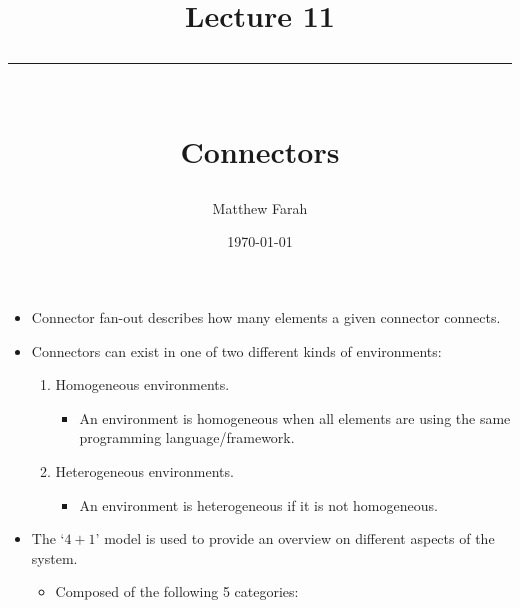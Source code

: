 \documentclass{article}
\date{
	\vspace{-.75em}
	{\large \today}
}
\title{
	\vspace*{-1.5em}
	{\Huge Lecture 11} \\
	\vspace{-1em}
	\rule{\textwidth/4}{.01em} \\
	\vspace{-.25em}
	{\Large Connectors}
	\vspace{-.75em}
}
\author{
	{\large Matthew Farah}
}
\begin{document}
\maketitle
\pagestyle{fancy}

\fi

\begin{itemize}
	\item Connector fan-out describes how many elements a given connector connects.
	\item Connectors can exist in one of two different kinds of environments:
	\begin{enumerate}
		\item Homogeneous environments.
		\begin{itemize}
			\item An environment is homogeneous when all elements are using the same programming language/framework.
		\end{itemize}
		\item Heterogeneous environments.
		\begin{itemize}
			\item An environment is heterogeneous if it is not homogeneous.
		\end{itemize}
	\end{enumerate}
	\item The `$4 + 1$' model is used to provide an overview on different aspects of the system.
	\begin{itemize}
		\item Composed of the following 5 categories:
	\end{itemize}
\end{itemize}

\ifdefined\iscombined
	\newpage
\else
	
\end{document}
